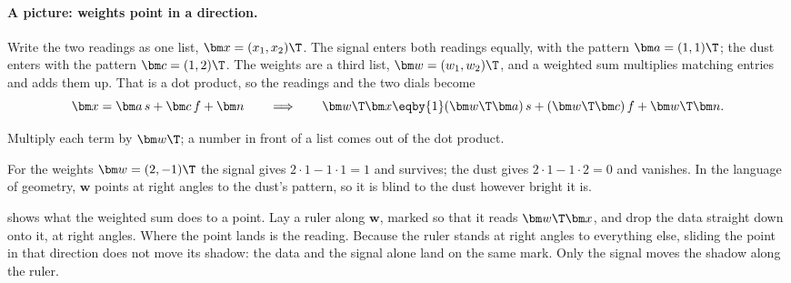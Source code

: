 \paragraph{A picture: weights point in a direction.}
Write the two readings as one list, $\bm x=(x_1,x_2)\T$. The signal enters
both readings equally, with the pattern $\bm a=(1,1)\T$; the dust enters
with the pattern $\bm c=(1,2)\T$. The weights are a third list,
$\bm w=(w_1,w_2)\T$, and a weighted sum multiplies matching entries and adds
them up. That is a dot product, so the readings and the two dials become
\begin{equation}
  \bm x=\bm a\,s+\bm c\,f+\bm n
  \qquad\Longrightarrow\qquad
  \bm w\T\bm x\eqby{1}(\bm w\T\bm a)\,s+(\bm w\T\bm c)\,f+\bm w\T\bm n .
  \label{3a:eq:dials-vector}
\end{equation}
\begin{explain}
  \item Multiply each term by $\bm w\T$; a number in front of a list comes
        out of the dot product.
\end{explain}
For the weights $\bm w=(2,-1)\T$ the signal gives $2\cdot1-1\cdot1=1$ and
survives; the dust gives $2\cdot1-1\cdot2=0$ and vanishes. In the language
of geometry, $\bm w$ points at right angles to the dust's pattern, so it is
blind to the dust however bright it is.

 shows what the weighted sum does to a point. Lay a ruler
along $\bm w$, marked so that it reads $\bm w\T\bm x$, and drop the data
straight down onto it, at right angles. Where the point lands is the reading.
Because the ruler stands at right angles to everything else, sliding the
point in that direction does not move its shadow: the data and the signal
alone land on the same mark. Only the signal moves the shadow along the
ruler.

